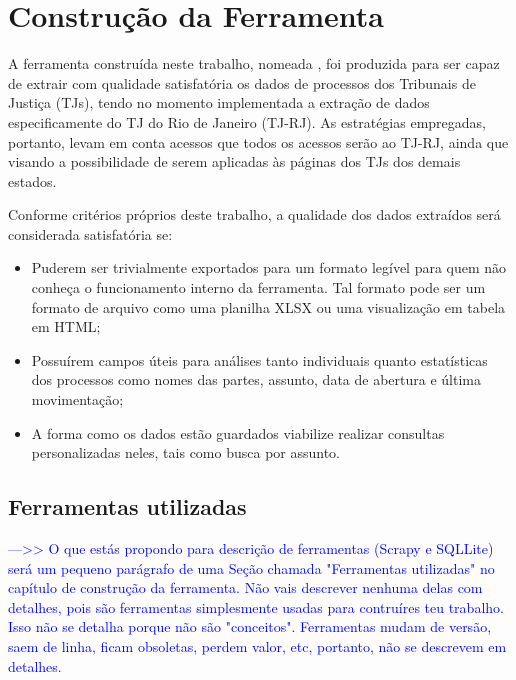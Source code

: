 \chapter{Construção da Ferramenta \tjscraper~\label{chp:construção-da-ferramenta}}

A ferramenta construída neste trabalho, nomeada \textbf{\tjscraper}, foi
produzida para ser capaz de extrair com qualidade satisfatória os dados de
processos dos Tribunais de Justiça (TJs), tendo no momento implementada a
extração de dados especificamente do TJ do Rio de Janeiro (TJ-RJ). As
estratégias empregadas, portanto, levam em conta acessos que todos os acessos
serão ao TJ-RJ, ainda que visando a possibilidade de serem aplicadas às páginas
dos TJs dos demais estados.

Conforme critérios próprios deste trabalho, a qualidade dos dados extraídos
será considerada satisfatória se:

\begin{itemize}
    \item Puderem ser trivialmente exportados para um formato legível para quem
        não conheça o funcionamento interno da ferramenta. Tal formato pode ser
        um formato de arquivo como uma planilha XLSX ou uma visualização em
        tabela em HTML;
    \item Possuírem campos úteis para análises tanto individuais quanto
        estatísticas dos processos como nomes das partes, assunto, data de
        abertura e última movimentação;
    \item A forma como os dados estão guardados viabilize realizar consultas
        personalizadas neles, tais como busca por assunto.
\end{itemize}

\section{Ferramentas utilizadas~\label{section:ferramentas-utilizadas}}

\textcolor{blue}{--->> O que estás propondo para descrição de ferramentas
(Scrapy e SQLLite) será um pequeno parágrafo de uma Seção chamada "Ferramentas
utilizadas" no capítulo de construção da ferramenta. Não vais descrever nenhuma
delas com detalhes, pois são ferramentas simplesmente usadas para contruíres
teu trabalho. Isso não se detalha porque não são "conceitos". Ferramentas mudam
de versão, saem de linha, ficam obsoletas, perdem valor, etc, portanto, não se
descrevem em detalhes.}

